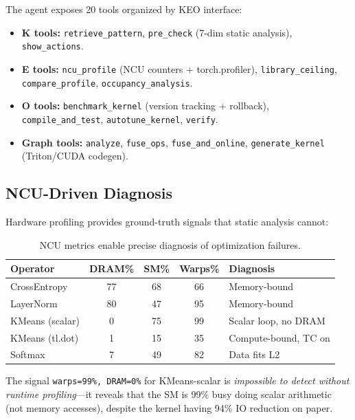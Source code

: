 \documentclass[sigconf,nonacm]{acmart}
\begin{document}
The agent exposes 20 tools organized by KEO interface:

\begin{itemize}
    \item \textbf{K tools:} \texttt{retrieve\_pattern}, \texttt{pre\_check}
          (7-dim static analysis), \texttt{show\_actions}.
    \item \textbf{E tools:} \texttt{ncu\_profile} (NCU counters
          + torch.profiler), \texttt{library\_ceiling},
          \texttt{compare\_profile}, \texttt{occupancy\_analysis}.
    \item \textbf{O tools:} \texttt{benchmark\_kernel} (version
          tracking + rollback), \texttt{compile\_and\_test},
          \texttt{autotune\_kernel}, \texttt{verify}.
    \item \textbf{Graph tools:} \texttt{analyze}, \texttt{fuse\_ops},
          \texttt{fuse\_and\_online}, \texttt{generate\_kernel}
          (Triton/CUDA codegen).
\end{itemize}

\subsection{NCU-Driven Diagnosis}

Hardware profiling provides ground-truth signals that static analysis cannot:

\begin{table}[h]
\centering
\caption{NCU metrics enable precise diagnosis of optimization failures.}
\label{tab:ncu}
\setlength{\tabcolsep}{3.5pt}
\small
\begin{tabular}{lcccl}
\toprule
Operator & DRAM\% & SM\% & Warps\% & Diagnosis \\
\midrule
CrossEntropy   & 77 & 68 & 66 & Memory-bound \\
LayerNorm      & 80 & 47 & 95 & Memory-bound \\
KMeans (scalar)& 0  & 75 & 99 & Scalar loop, no DRAM \\
KMeans (tl.dot)& 1  & 15 & 35 & Compute-bound, TC on \\
Softmax        & 7  & 49 & 82 & Data fits L2 \\
\bottomrule
\end{tabular}
\end{table}

The signal \texttt{warps=99\%, DRAM=0\%} for KMeans-scalar is \emph{impossible to detect without runtime profiling}---it reveals that the SM is 99\% busy doing scalar arithmetic (not memory accesses), despite the kernel having 94\% IO reduction on paper.
\end{document}
